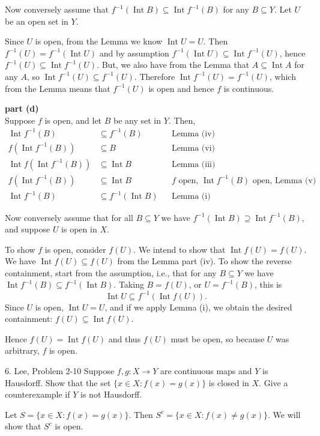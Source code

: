 \documentclass{homework}
\newcommand{\ra}{\rightarrow}
\DeclareMathOperator{\Int}{\mathrm{Int}}
\begin{document}
Now conversely assume that $f^{-1}(\Int B)\subseteq\Int f^{-1}(B)$
for any $B \subseteq Y$.  Let $U$ be an open set in $Y$.

Since $U$
is open, from the Lemma we know $\Int U=U$.
Then $f^{-1}(U)=f^{-1}(\Int U)$ and by assumption
$f^{-1}(\Int U) \subseteq \Int f^{-1}(U)$, hence
$f^{-1}(U)\subseteq\Int f^{-1}(U)$.
  But, we also have
from the Lemma that $A\subseteq\Int A$ for any $A$, so
$\Int f^{-1}(U) \subseteq f^{-1}(U)$.
Therefore $\Int f^{-1}(U)=f^{-1}(U)$, which from the Lemma
means that $f^{-1}(U)$ is open and hence $f$ is continuous.

\textbf{part (d)}\\
Suppose $f$ is open, and let $B$ be any set in $Y$.  Then,
\begin{align*}
\Int f^{-1}(B) &\subseteq f^{-1}(B) &&\text{Lemma (iv)} \\
f(\Int f^{-1}(B)) &\subseteq B &&\text{Lemma (vi)}\\
\Int f(\Int f^{-1}(B)) &\subseteq \Int B &&\text{Lemma (iii)} \\
f(\Int f^{-1}(B)) &\subseteq \Int B &&\text{$f$ open, $\Int f^{-1}(B)$ open, Lemma (v)} \\
\Int f^{-1}(B) &\subseteq f^{-1}(\Int B) &&\text{Lemma (i)}
\end{align*}

Now conversely assume that for all $B\subseteq Y$ we have
$f^{-1}(\Int B)\supseteq\Int f^{-1}(B)$, and suppose $U$ is
open in $X$.

To show $f$ is open, consider $f(U)$.  We intend to show that
$\Int f(U)=f(U)$.  We have $\Int f(U) \subseteq f(U)$ from
the Lemma part (iv).  To show the reverse containment, start from
the assumption, i.e., that for any $B\subseteq Y$ we have
$\Int f^{-1}(B)\subseteq f^{-1}(\Int B).$
Taking $B=f(U)$, or $U=f^{-1}(B)$, this is
$$ \Int U \subseteq f^{-1}(\Int f(U)). $$
Since $U$ is open, $\Int U=U$, and if we apply Lemma (i), we
obtain the desired containment: $f(U) \subseteq \Int f(U)$.

Hence $f(U)=\Int f(U)$ and thus $f(U)$ must be open, so because $U$
was arbitrary, $f$ is open.

\hrulefill
\begin{exercise}{6. Lee, Problem 2-10}
Suppose $f,g:X\ra Y$ are continuous maps and $Y$ is Hausdorff.  Show that the set
$\{x\in X:f(x)=g(x)\}$ is closed in $X$.  Give a counterexample if $Y$ is not
Hausdorff.
\end{exercise}
\solution
Let $S=\{x\in X:f(x)=g(x)\}$.  Then $S^c =\{x\in X:f(x)\ne g(x)\}$.
We will show that $S^c$ is open.
\end{document}
